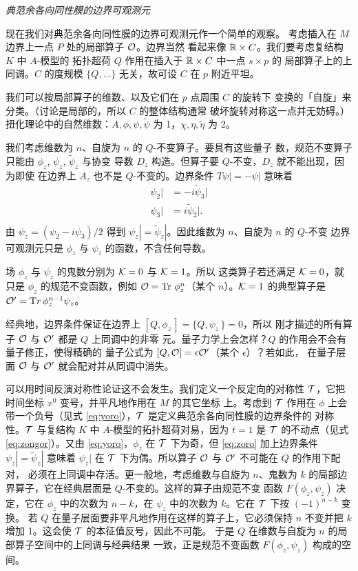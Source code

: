 \par\medskip\emph{典范余各向同性膜的边界可观测元}

现在我们对典范余各向同性膜的边界可观测元作一个简单的观察。
考虑插入在 $M$ 边界上一点 $P$ 处的局部算子 ${\EUO}$。边界当然
看起来像 $\Bbb{R}\times C$。我们要考虑复结构 $K$ 中 $A$-模型的
拓扑超荷 $Q$ 作用在插入于 $\Bbb{R}\times C$ 中一点 $s\times p$ 的
局部算子上的上同调。$C$ 的度规模 $\{Q,\dots\}$ 无关，故可设 $C$
在 $p$ 附近平坦。

我们可以按局部算子的维数、以及它们在 $p$ 点周围 $C$ 的旋转下
变换的「自旋」来分类。（讨论是局部的，所以 $C$ 的整体结构通常
破坏旋转对称这一点并无妨碍。）扭化理论中的自然维数：$A,\phi,
\psi,\tilde\psi$ 为 1，$\chi,\eta,\tilde\eta$ 为 2。

我们考虑维数为 $n$、自旋为 $n$ 的 $Q$-不变算子。要具有这些量子
数，规范不变算子只能由 $\phi_z$, $\psi_z$, $\tilde\psi_z$ 与协变
导数 $D_z$ 构造。但算子要 $Q$-不变，$D_z$ 就不能出现，因为即使
在边界上 $A_z$ 也不是 $Q$-不变的。边界条件 $\hat T\psi|=-\psi|$
意味着
\setcounter{equation}{34}
\begin{equation}\label{eq:bdrry}
\begin{aligned}\psi_2|&=-i\tilde\psi_3|\\
\psi_3|&=i\tilde\psi_2|.\\\end{aligned}
\end{equation}
 由 $\psi_z=(\psi_2-i\psi_3)/2$ 得到
$\psi_z|=\tilde\psi_z|$。因此维数为 $n$、自旋为 $n$ 的 $Q$-不变
边界可观测元只是 $\phi_z$ 与 $\psi_z$ 的函数，不含任何导数。

场 $\phi_z$ 与 $\psi_z$ 的鬼数分别为 $\EUK=0$ 与 $\EUK=1$。所以
这类算子若还满足 $\EUK=0$，就只是 $\phi_z$ 的规范不变函数，例如
${\EUO}=\Tr\,\phi_z^n$（某个 $n$）。$\EUK=1$ 的典型算子是
${\EUO}'={\rm Tr}\,\phi_z^{n-1}\psi_z$。

经典地，边界条件保证在边界上 $[Q,\phi_z\,]=\{Q,\psi_z\,\}=0$，所以
刚才描述的所有算子 ${\EUO}$ 与 ${\EUO}'$ 都是 $Q$ 上同调中的非零
元。量子力学上会怎样？$Q$ 的作用会不会有量子修正，使得精确的
量子公式为 $[Q,{\EUO}]=\epsilon{\EUO}'$（某个 $\epsilon$）？若如此，
在量子层面 ${\EUO}$ 与 ${\EUO}'$ 就会配对并从同调中消失。

可以用时间反演对称性论证这不会发生。我们定义一个反定向的对称性
${\EUT}$，它把时间坐标 $x^0$ 变号，并平凡地作用在 $M$ 的其它坐标
上。考虑到 ${\EUT}$ 作用在 $\phi$ 上会带一个负号（见式
\eqref{eq:yoro}），${\EUT}$ 是定义典范余各向同性膜的边界条件的
对称性。${\EUT}$ 与复结构 $K$ 中 $A$-模型的拓扑超荷对易，因为
$t=1$ 是 ${\EUT}$ 的不动点（见式 \eqref{eq:zongor}）。又由
\eqref{eq:yoro}，$\phi_z$ 在 ${\EUT}$ 下为奇，但 \eqref{eq:zoro}
加上边界条件 $\psi_z|=\tilde\psi_z|$ 意味着 $\psi_z|$ 在 ${\EUT}$
下为偶。所以算子 ${\EUO}$ 与 ${\EUO}'$ 不可能在 $Q$ 的作用下配对，
必须在上同调中存活。更一般地，考虑维数与自旋为 $n$、鬼数为 $k$
的局部边界算子，它在经典层面是 $Q$-不变的。这样的算子由规范不变
函数 $F(\phi_z,\psi_z)$ 决定，它在 $\phi_z$ 中的次数为 $n-k$，在
$\psi_z$ 中的次数为 $k$。它在 ${\EUT}$ 下按 $(-1)^{n-k}$ 变换。
若 $Q$ 在量子层面要非平凡地作用在这样的算子上，它必须保持 $n$
不变并把 $k$ 增加 1。这会使 ${\EUT}$ 的本征值反号，因此不可能。
于是 $Q$ 在维数与自旋为 $n$ 的局部算子空间中的上同调与经典结果
一致，正是规范不变函数 $F(\phi_z,\psi_z)$ 构成的空间。


